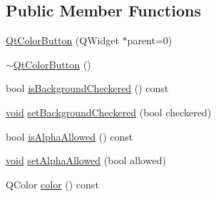 \subsection*{Public Member Functions}
\begin{DoxyCompactItemize}
\item 
\hyperlink{class_utils_1_1_qt_color_button_a862470cc17ccbdbf69d12e6b3baffd3f}{Qt\-Color\-Button} (Q\-Widget $\ast$parent=0)
\item 
\hyperlink{class_utils_1_1_qt_color_button_ab59d7fd36eca0eb26a51569377968efc}{$\sim$\-Qt\-Color\-Button} ()
\item 
bool \hyperlink{class_utils_1_1_qt_color_button_a397b4327a6364c35a8b874a793448d8e}{is\-Background\-Checkered} () const 
\item 
\hyperlink{group___u_a_v_objects_plugin_ga444cf2ff3f0ecbe028adce838d373f5c}{void} \hyperlink{class_utils_1_1_qt_color_button_a5fde758d6b75cddc7100d7c8ab9d3b55}{set\-Background\-Checkered} (bool checkered)
\item 
bool \hyperlink{class_utils_1_1_qt_color_button_af75a4d95ae33c4b60984d3bd63192ea4}{is\-Alpha\-Allowed} () const 
\item 
\hyperlink{group___u_a_v_objects_plugin_ga444cf2ff3f0ecbe028adce838d373f5c}{void} \hyperlink{class_utils_1_1_qt_color_button_af7e383413673edc1a12e2f1720b729c6}{set\-Alpha\-Allowed} (bool allowed)
\item 
Q\-Color \hyperlink{class_utils_1_1_qt_color_button_a92e2a2c0c46041074dddcbdc67ae682a}{color} () const 
\end{DoxyCompactItemize}

